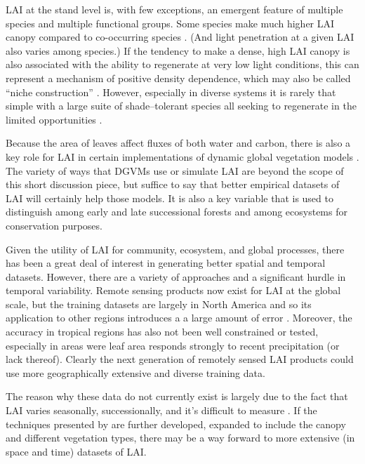 \documentclass[11pt]{article}
\begin{document}
    LAI at the stand level is, with few exceptions, an emergent feature of multiple species and multiple functional groups.  Some species make much higher LAI canopy compared to co-occurring species  \citep{kassnacht1997interrelationships}.   (And light penetration at a given LAI also varies among species.)  If the tendency to make a dense, high LAI canopy is also associated with the ability to regenerate at very low light conditions, this can represent a mechanism of positive density dependence, which may also be called ``niche construction'' \citep[\emph{sensu}][]{odling2003niche}.  However, especially in diverse systems it is rarely that simple with a large suite of shade--tolerant species all seeking to regenerate in the limited opportunities \citep{valladares2008shade}.  
	
	Because the area of leaves affect fluxes of both water and carbon, there is also a key role for LAI in certain implementations of dynamic global vegetation models \citep[DGVMs, e.g.][]{murray2013evaluation}.  The variety of ways that DGVMs use or simulate LAI are beyond the scope of this short discussion piece, but suffice to say that better empirical datasets of LAI will certainly help those models.  It is also a key variable that is used to distinguish among early and late successional forests and among ecosystems for conservation purposes.  
	
	Given the utility of LAI for community, ecosystem, and global processes, there has been a great deal of interest in generating better spatial and temporal datasets.  However, there are a variety of approaches \citep{jonckheere2004review, breda2003ground} and a significant hurdle in temporal variability.  Remote sensing products now exist for LAI at the global scale, but the training datasets are largely in North America and so its application to other regions introduces a a large amount of error \citep[e.g. for Australia see][]{hill2006assessment}.  Moreover, the accuracy in tropical regions has also not been well constrained or tested, especially in areas were leaf area responds strongly to recent precipitation (or lack thereof).  Clearly the next generation of remotely sensed LAI products could use more geographically extensive and diverse training data.  
	
	The reason why these data do not currently exist is largely due to the fact that LAI varies seasonally, successionally, and it's difficult to measure \citep{jonckheere2004review}.  If the techniques presented by \cite{dobert2015can} are further developed, expanded to include the canopy and different vegetation types, there may be a way forward to more extensive (in space and time) datasets of LAI.  
	
	
	
	
\end{document}
